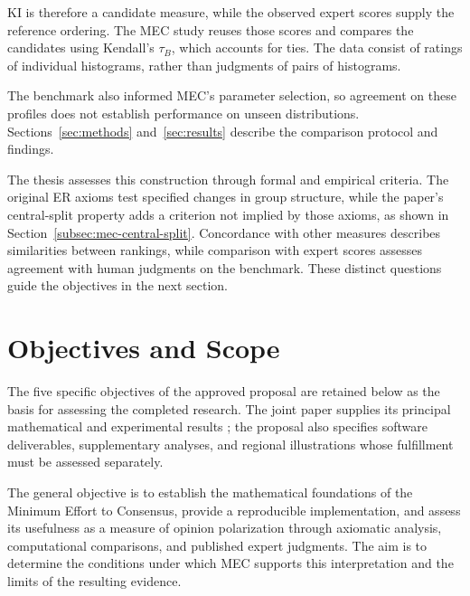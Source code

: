 \documentclass{article}
\theoremstyle{plain}
\theoremstyle{remark}
\begin{document}
KI is therefore a candidate measure, while the observed expert scores supply the reference ordering. The MEC study reuses those scores and compares the candidates using Kendall's $\tau_B$, which accounts for ties. The data consist of ratings of individual histograms, rather than judgments of pairs of histograms.

The benchmark also informed MEC's parameter selection, so agreement on these profiles does not establish performance on unseen distributions. Sections~\ref{sec:methods} and~\ref{sec:results} describe the comparison protocol and findings.



The thesis assesses this construction through formal and empirical criteria. The original ER axioms test specified changes in group structure, while the paper's central-split property adds a criterion not implied by those axioms, as shown in Section~\ref{subsec:mec-central-split}. Concordance with other measures describes similarities between rankings, while comparison with expert scores assesses agreement with human judgments on the benchmark. These distinct questions guide the objectives in the next section.

\section{Objectives and Scope}\label{sec:objectives}

The five specific objectives of the approved proposal are retained below as the basis for assessing the completed research. The joint paper supplies its principal mathematical and experimental results \citep{aranda2026mec}; the proposal also specifies software deliverables, supplementary analyses, and regional illustrations whose fulfillment must be assessed separately.

The general objective is to establish the mathematical foundations of the Minimum Effort to Consensus, provide a reproducible implementation, and assess its usefulness as a measure of opinion polarization through axiomatic analysis, computational comparisons, and published expert judgments. The aim is to determine the conditions under which MEC supports this interpretation and the limits of the resulting evidence.
\end{document}
